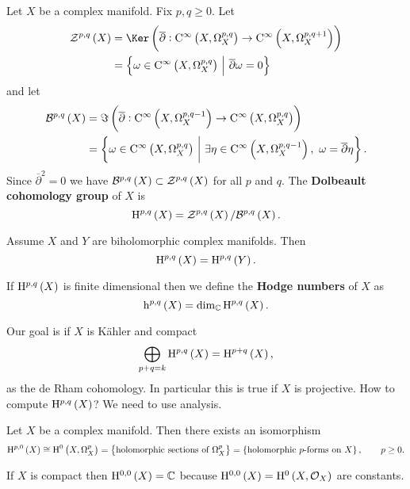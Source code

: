 Let $ X $ be a complex manifold. Fix $ p, q \ge 0 $. Let
\begin{align*}
\ZZZ^{p, q}\br{X}
& = \Ker \br{\overline{\partial} : \C^\infty\br{X, \Omega_X^{p, q}} \to \C^\infty\br{X, \Omega_X^{p, q + 1}}} \\
& = \cbr{\omega \in \C^\infty\br{X, \Omega_X^{p, q}} \st \overline{\partial}\omega = 0}
\end{align*}
and let
\begin{align*}
\BBB^{p, q}\br{X}
& = \Im \br{\overline{\partial} : \C^\infty\br{X, \Omega_X^{p, q - 1}} \to \C^\infty\br{X, \Omega_X^{p, q}}} \\
& = \cbr{\omega \in \C^\infty\br{X, \Omega_X^{p, q}} \st \exists \eta \in \C^\infty\br{X, \Omega_X^{p, q - 1}}, \ \omega = \overline{\partial}\eta}.
\end{align*}
Since $ \overline{\partial}^2 = 0 $ we have $ \BBB^{p, q}\br{X} \subset \ZZZ^{p, q}\br{X} $ for all $ p $ and $ q $. The \textbf{Dolbeault cohomology group} of $ X $ is
$$ \H^{p, q}\br{X} = \ZZZ^{p, q}\br{X} / \BBB^{p, q}\br{X}. $$

\pagebreak

\begin{exercise*}
Assume $ X $ and $ Y $ are biholomorphic complex manifolds. Then
$$ \H^{p, q}\br{X} = \H^{p, q}\br{Y}. $$
\end{exercise*}

If $ \H^{p, q}\br{X} $ is finite dimensional then we define the \textbf{Hodge numbers} of $ X $ as
$$ \h^{p, q}\br{X} = \dim_\CC \H^{p, q}\br{X}. $$


Our goal is if $ X $ is K\"ahler and compact
$$ \bigoplus_{p + q = k} \H^{p, q}\br{X} = \H^{p + q}\br{X}, $$
as the de Rham cohomology. In particular this is true if $ X $ is projective. How to compute $ \H^{p, q}\br{X} $? We need to use analysis.

\begin{proposition}
Let $ X $ be a complex manifold. Then there exists an isomorphism
$$ \H^{p, 0}\br{X} \cong \H^0\br{X, \Omega_X^p} = \cbr{\text{holomorphic sections of} \ \Omega_X^p} = \cbr{\text{holomorphic $ p $-forms on} \ X}, \qquad p \ge 0. $$
\end{proposition}

\begin{remark*}
If $ X $ is compact then $ \H^{0, 0}\br{X} = \CC $ because $ \H^{0, 0}\br{X} = \H^0\br{X, \OOO_X} $ are constants.
\end{remark*}

